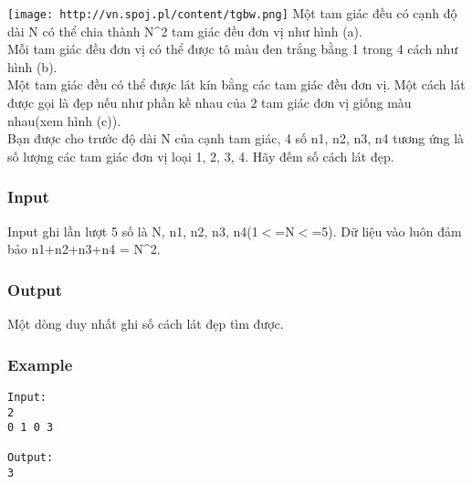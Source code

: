 




\texttt{[image: http://vn.spoj.pl/content/tgbw.png]}   Một tam giác đều có cạnh độ dài N có thể chia thành N\textasciicircum2 tam giác đều đơn vị như hình (a).   
\\   Mỗi tam giác đều đơn vị có thể được tô màu đen trắng bằng 1 trong 4 cách như hình (b).   
\\   Một tam giác đều có thể được lát kín bằng các tam giác đều đơn vị. Một cách lát được gọi là đẹp nếu như phần kề nhau của 2 tam giác đơn vị giống màu nhau(xem hình (c)).   
\\   Bạn được cho trước độ dài N của cạnh tam giác, 4 số n1, n2, n3, n4 tương ứng là số lượng các tam giác đơn vị loại 1, 2, 3, 4. Hãy đếm số cách lát đẹp.  

\subsubsection{   Input  }

   Input ghi lần lượt 5 số là N, n1, n2, n3, n4(1$<$=N$<$=5). Dữ liệu vào luôn đảm bảo n1+n2+n3+n4 = N\textasciicircum2.  

\subsubsection{   Output  }

   Một dòng duy nhất ghi số cách lát đẹp tìm được.  

\subsubsection{   Example  }
\begin{verbatim}
Input:
2
0 1 0 3

Output:
3
\end{verbatim}